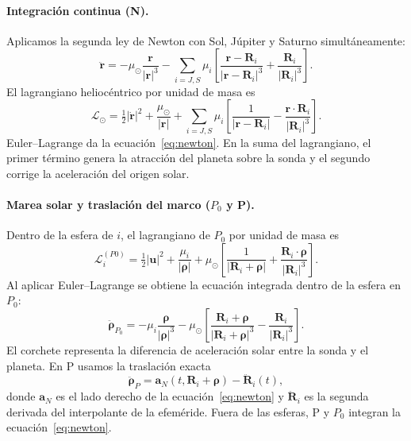 \documentclass[11pt,letterpaper]{article}
\newcommand{\vect}[1]{\mathbf{#1}}
\begin{document}
\paragraph{Integración continua (N).}
Aplicamos la segunda ley de Newton con Sol, Júpiter y Saturno simultáneamente:
\begin{equation}
\ddot{\vect r}=-\mu_\odot\frac{\vect r}{|\vect r|^3}
-\sum_{i=J,S}\mu_i\left[
\frac{\vect r-\vect R_i}{|\vect r-\vect R_i|^3}+
\frac{\vect R_i}{|\vect R_i|^3}\right].
\label{eq:newton}
\end{equation}
El lagrangiano heliocéntrico por unidad de masa es
\[
\mathcal L_\odot=\tfrac12|\dot{\vect r}|^2+\frac{\mu_\odot}{|\vect r|}
+\sum_{i=J,S}\mu_i\left[\frac1{|\vect r-\vect R_i|}
-\frac{\vect r\cdot\vect R_i}{|\vect R_i|^3}\right].
\]
Euler--Lagrange da la ecuación~\eqref{eq:newton}. En la suma del lagrangiano, el primer término genera la atracción del planeta sobre la sonda y el segundo corrige la aceleración del origen solar.

\paragraph{Marea solar y traslación del marco ($P_0$ y P).} Dentro de la esfera de $i$, el lagrangiano de $P_0$ por unidad de masa es
\[
\mathcal L_i^{(P0)}=\tfrac12|\vect u|^2+\frac{\mu_i}{|\vect\rho|}
+\mu_\odot\left[\frac1{|\vect R_i+\vect\rho|}
+\frac{\vect R_i\cdot\vect\rho}{|\vect R_i|^3}\right].
\]
Al aplicar Euler--Lagrange se obtiene la ecuación integrada dentro de la esfera en $P_0$:
\begin{equation}
\ddot{\vect\rho}_{P_0}=-\mu_i\frac{\vect\rho}{|\vect\rho|^3}
-\mu_\odot\left[
\frac{\vect R_i+\vect\rho}{|\vect R_i+\vect\rho|^3}
-\frac{\vect R_i}{|\vect R_i|^3}
\right].
\end{equation}
El corchete representa la diferencia de aceleración solar entre la sonda y el planeta. En P usamos la traslación exacta
\begin{equation}
\ddot{\vect\rho}_{P}=\vect a_N(t,\vect R_i+\vect\rho)-\ddot{\vect R}_i(t),
\end{equation}
donde $\vect a_N$ es el lado derecho de la ecuación~\eqref{eq:newton} y $\ddot{\vect R}_i$ es la segunda derivada del interpolante de la efeméride. Fuera de las esferas, P y $P_0$ integran la ecuación~\eqref{eq:newton}.
\end{document}

